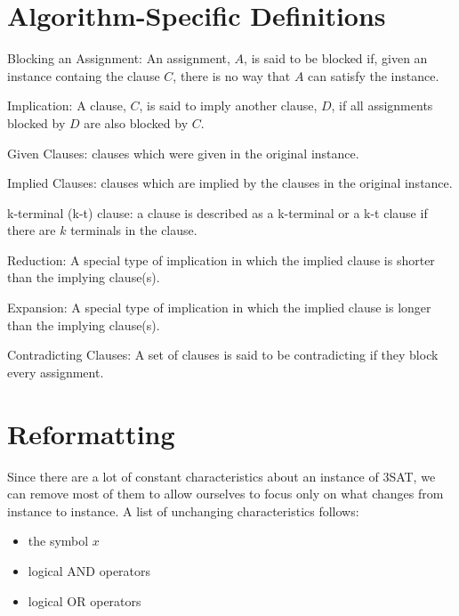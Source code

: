 \documentclass[manuscript]{acmart}
\begin{document}
    \section{Algorithm-Specific Definitions}
    \begin{definition}
        Blocking an Assignment: An assignment, $A$, is said to be blocked if, 
        given an instance containg the clause $C$, there is no way that $A$ can 
        satisfy the instance.
    \end{definition}
    \begin{definition}
        Implication: A clause, $C$, is said to imply another clause, $D$, if all 
        assignments blocked by $D$ are also blocked by $C$.
    \end{definition}
    \begin{definition}
        Given Clauses: clauses which were given in the original instance.
    \end{definition}
    \begin{definition}
        Implied Clauses: clauses which are implied by the clauses in the original instance.
    \end{definition}
    \begin{definition}
        k-terminal (k-t) clause: a clause is described as a k-terminal or a k-t clause
        if there are $k$ terminals in the clause.
    \end{definition}
    \begin{definition}
        Reduction: A special type of implication in which the implied 
        clause is shorter than the implying clause(s).
    \end{definition}
    \begin{definition}
        Expansion: A special type of implication in which the 
        implied clause is longer than the implying clause(s).
    \end{definition}
    \begin{definition}
        Contradicting Clauses: A set of clauses is said to be contradicting if
        they block every assignment.
    \end{definition}

    \section{Reformatting}

    Since there are a lot of constant characteristics about an instance of 3SAT, 
    we can remove most of them to allow ourselves to focus only on what changes
    from instance to instance. A list of unchanging characteristics follows:
    \begin{itemize}
        \item the symbol $x$
        \item logical AND operators
        \item logical OR operators
    \end{itemize}
    
\end{document}
